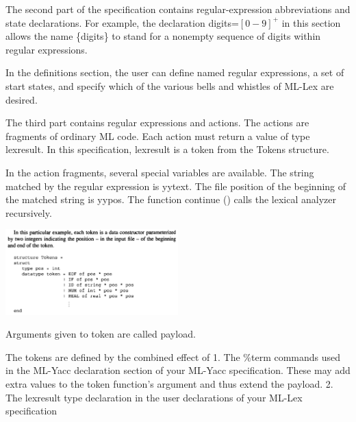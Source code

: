 \documentclass[8pt, a4paper, oneside, twocolumn]{extarticle}
\begin{document}
The second part of the specification contains regular-expression  
abbreviations and state declarations. For example, the declaration digits=$[0-9]^+$ 
in this section allows the name \{digits\} to stand for a nonempty sequence 
of digits within regular expressions. 

In the definitions section, the user can define named regular expressions, a set of start states, and specify which of the various bells and whistles of ML-Lex are desired.

The third part contains regular expressions and actions. The actions are 
fragments of ordinary ML code. Each action must return a value of type 
lexresult. In this specification, lexresult is a token from the Tokens 
structure. 

In the action fragments, several special variables are available. The string 
matched by the regular expression is yytext. The file position of the  
beginning of the matched string is yypos. The function continue () calls the 
lexical analyzer recursively. 

\includegraphics[width=0.5\textwidth,height=0.5\textheight,keepaspectratio]{lex2}

Arguments given to token are called payload.

The tokens are defined by the combined effect of
1. The \%term commands used in the ML-Yacc declaration section of your ML-Yacc
specification. These may add extra values to the token function’s argument and
thus extend the payload.
2. The lexresult type declaration in the user declarations of your ML-Lex specification
\end{document}

